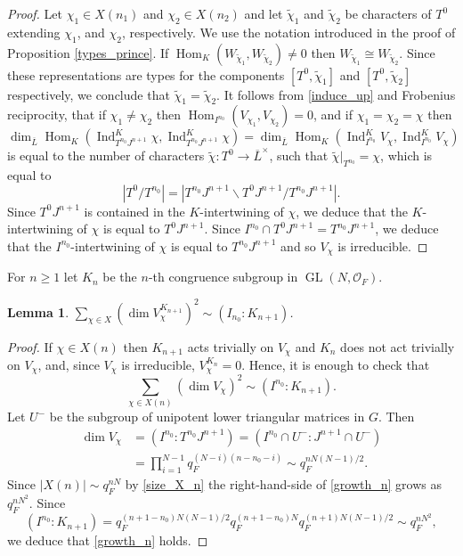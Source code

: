 \documentclass[11pt]{article}
\let\mathcal\mathscr
\newtheorem{lem}[prop]{Lemma}
\theoremstyle{definition}
\DeclareMathOperator{\Hom}{Hom}
\DeclareMathOperator{\Ind}{Ind}
\DeclareMathOperator{\GL}{GL}
\newcommand{\Indu}[3]{\Ind_{#1}^{#2}{#3}}
\newcommand{\cO}{\mathcal{O}}
\newcommand{\Lbar}{\overline{L}}
\begin{document}
\begin{proof} Let $\chi_1\in X(n_1)$ and $\chi_2\in X(n_2)$ and let $\tilde{\chi}_1$ and $\tilde{\chi}_2$ be characters of $T^0$ extending $\chi_1$, and $\chi_2$, respectively.
We use the notation introduced in the proof of Proposition \ref{types_prince}. If $\Hom_K(W_{\tilde{\chi}_1}, W_{\tilde{\chi}_2})\neq 0$ then $W_{\tilde{\chi}_1}\cong W_{\tilde{\chi}_2}$.
Since these representations are types for the components $[T^0, \tilde{\chi}_1]$ and
$[T^0, \tilde{\chi}_2]$ respectively, we conclude that $\tilde{\chi}_1=\tilde{\chi}_2$. It follows from
\eqref{induce_up} and Frobenius reciprocity, that if $\chi_1\neq \chi_2$ then $\Hom_{I^{n_0}}(V_{\chi_1}, V_{\chi_2})=0$, and if $\chi_1=\chi_2=\chi$ then
\[
\dim_{\Lbar}\Hom_K( \Indu{T^{n_0}J^{n+1}}{K}{\chi}, \Indu{T^{n_0}J^{n+1}}{K}{\chi})= \dim_{\Lbar} \Hom_K( \Indu{I^{n_0}}{K}{V_\chi}, \Indu{I^{n_0}}{K}{V_\chi})
\]
is equal to the number of characters $\tilde{\chi}: T^0\to \Lbar^{\times}$, such that $\tilde{\chi}|_{T^{n_0}}= \chi$, which is equal to
\[
| T^0/ T^{n_0}|=|T^{n_0} J^{n+1}\backslash T^{0} J^{n+1} / T^{n_0} J^{n+1}|.
\]
Since $T^0 J^{n+1}$ is contained in the $K$-intertwining of $\chi$, we deduce that the $K$\nobreakdash-inter\-twining of $\chi$ is equal to $T^0 J^{n+1}$. Since $I^{n_0} \cap T^0 J^{n+1}= T^{n_0} J^{n+1}$,
we deduce that the $I^{n_0}$-intertwining of $\chi$ is equal to $T^{n_0} J^{n+1}$ and so $V_{\chi}$ is irreducible.
\end{proof}

For $n\ge 1$ let $K_n$ be the $n$-th congruence subgroup in $\GL(N, \cO_F)$.
\begin{lem}\label{asymptotic_prince}
$\sum_{\chi\in X} (\dim V_{\chi}^{K_{n+1}})^2 \sim (I_{n_0}: K_{n+1})$.
\end{lem}

\begin{proof}
If $\chi\in X(n)$ then $K_{n+1}$ acts trivially on $V_{\chi}$ and $K_n$ does not act trivially on $V_{\chi}$, and, since $V_{\chi}$ is irreducible, $V_{\chi}^{K_n}=0$. Hence, it is enough to check that
\begin{equation}\label{growth_n}
\sum_{\chi\in X(n)} (\dim V_{\chi})^2 \sim (I^{n_0}: K_{n+1}).
\end{equation}
Let $U^-$ be the subgroup of unipotent lower triangular matrices in $G$. Then
\begin{equation} \label{dim_V_chi}
\begin{split}
\dim V_{\chi}&= ( I^{n_0}: T^{n_0} J^{n+1})= (I^{n_0}\cap U^-: J^{n+1} \cap U^-)\\
& = \prod_{i=1}^{N-1} q_F^{(N-i)(n-n_0-i)}\sim q_F^{n N(N-1)/2}.
\end{split}
\end{equation}
Since $|X(n)|\sim q_F^{nN}$ by \eqref{size_X_n} the right-hand-side of \eqref{growth_n} grows as $q_F^{n N^2}$. Since
\begin{equation} \label{index}
(I^{n_0}: K_{n+1})= q_F^{(n+1 -n_0) N(N-1)/2} q_F^{(n+1-n_0) N} q_F^{(n+1)N(N-1)/2}\sim q_F^{n N^2},
\end{equation}
we deduce that \eqref{growth_n} holds.
\end{proof}
\end{document}
